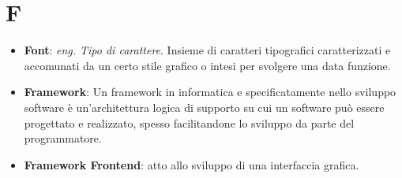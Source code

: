 \section{F}
\begin{itemize}
	\item
	\textbf{Font}: \textit{eng. Tipo di carattere}. Insieme di caratteri tipografici caratterizzati e accomunati da un certo stile grafico o intesi per svolgere una data funzione.
	\item
	\textbf{Framework}: Un framework in informatica e specificatamente nello sviluppo software è un'architettura logica di supporto su cui un software può essere progettato e realizzato, spesso facilitandone lo sviluppo da parte del programmatore.
	\item
	\textbf{Framework Frontend}:  atto allo sviluppo di una interfaccia grafica.
\end{itemize}
\newpage